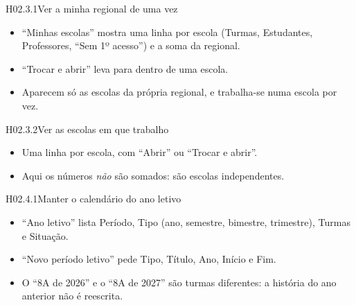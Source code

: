 
\begin{historia}{H02.3.1}{Ver a minha regional de uma vez}{\pronto}
\aceite
\begin{itemize}
  \item \enquote{Minhas escolas} mostra uma linha por escola (Turmas,
    Estudantes, Professores, \enquote{Sem 1º acesso}) e a soma da regional.
  \item \enquote{Trocar e abrir} leva para dentro de uma escola.
  \item Aparecem só as escolas da própria regional, e trabalha-se numa escola
    por vez.
\end{itemize}
\end{historia}

\begin{historia}{H02.3.2}{Ver as escolas em que trabalho}{\pronto}
\aceite
\begin{itemize}
  \item Uma linha por escola, com \enquote{Abrir} ou \enquote{Trocar e abrir}.
  \item Aqui os números \emph{não} são somados: são escolas independentes.
\end{itemize}
\end{historia}


\begin{historia}{H02.4.1}{Manter o calendário do ano letivo}{\pronto}
\aceite
\begin{itemize}
  \item \enquote{Ano letivo} lista Período, Tipo (ano, semestre, bimestre,
    trimestre), Turmas e Situação.
  \item \enquote{Novo período letivo} pede Tipo, Título, Ano, Início e Fim.
  \item O \enquote{8A de 2026} e o \enquote{8A de 2027} são turmas diferentes:
    a história do ano anterior não é reescrita.
\end{itemize}
\end{historia}

